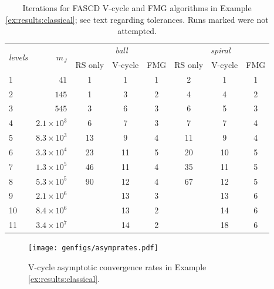 \documentclass[review,hidelinks,onefignum,onetabnum]{siamart220329}
\newcommand{\XX}{\ding{55}}
\begin{document}
\begin{table}[ht]
\centering
\begin{tabular}{lr@{\hskip 7mm}cccccc}
\toprule
\multirow{2}{*}{\emph{levels}} & \multirow{2}{*}{$m_J$} & \multicolumn{3}{c}{\,\emph{ball}} & \multicolumn{3}{c}{\,\emph{spiral}} \\ \cmidrule(lr){3-5} \cmidrule(lr){6-8}
   &                  & RS only & V-cycle & FMG & RS only & V-cycle & FMG \\
\midrule
 1 &             $41$ &   1 &  1 &  1 &   2 &  1 &  1 \\
 2 &            $145$ &   1 &  3 &  2 &   4 &  4 &  2 \\
 3 &            $545$ &   3 &  6 &  3 &   6 &  5 &  3 \\
 4 & $2.1\times 10^3$ &   6 &  7 &  3 &   7 &  7 &  4 \\
 5 & $8.3\times 10^3$ &  13 &  9 &  4 &  11 &  9 &  4 \\
 6 & $3.3\times 10^4$ &  23 & 11 &  5 &  20 & 10 &  5 \\
 7 & $1.3\times 10^5$ &  46 & 11 &  4 &  35 & 11 &  5 \\
 8 & $5.3\times 10^5$ &  90 & 12 &  4 &  67 & 12 &  5 \\
 9 & $2.1\times 10^6$ & \XX & 13 &  3 & \XX & 13 &  6 \\
10 & $8.4\times 10^6$ & \XX & 13 &  2 & \XX & 14 &  6 \\
11 & $3.4\times 10^7$ & \XX & 14 &  2 & \XX & 18 &  6 \\
\bottomrule
\end{tabular}
\bigskip
\caption{Iterations for FASCD V-cycle and FMG algorithms in Example \ref{ex:results:classical}; see text regarding tolerances.  Runs marked \XX\xspace were not attempted.}
\label{tab:results:classical}
\end{table}

\begin{figure}[ht]
\centering
\texttt{[image: genfigs/asymprates.pdf]}
\caption{V-cycle asymptotic convergence rates in Example \ref{ex:results:classical}.}
\label{fig:results:asymp}
\end{figure}
\end{document}
